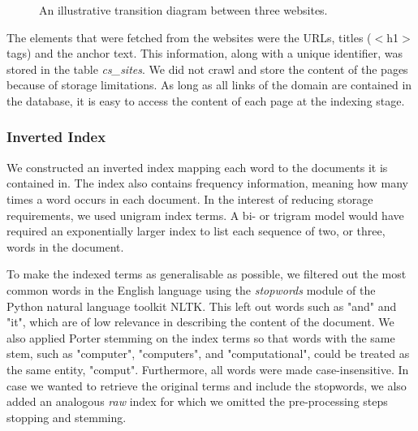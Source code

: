 \begin{figure}[!h]
\centering
\caption{An illustrative transition diagram between three websites.}
\label{fig:graph}
\end{figure}

The elements that were fetched from the websites were the URLs, titles ($<$h1$>$ tags) and the anchor text. This information, along with a unique identifier, was stored in the table \emph{cs\_sites}. We did not crawl and store the content of the pages because of storage limitations. As long as all links of the domain are contained in the database, it is easy to access the content of each page at the indexing stage.


\subsubsection{Inverted Index} %
\label{ssub:inverted_index}

We constructed an inverted index mapping each word to the documents it is contained in. The index also contains frequency information, meaning how many times a word occurs in each document. In the interest of reducing storage requirements, we used unigram index terms. A bi- or trigram model would have required an exponentially larger index to list each sequence of two, or three, words in the document.

To make the indexed terms as generalisable as possible, we filtered out the most common words in the English language using the \emph{stopwords} module of the Python natural language toolkit NLTK. This left out words such as "and" and "it", which are of low relevance in describing the content of the document. We also applied Porter stemming \cite{porter1980algorithm} on the index terms so that words with the same stem, such as "computer", "computers", and "computational", could be treated as the same entity, "comput". Furthermore, all words were made case-insensitive. In case we wanted to retrieve the original terms and include the stopwords, we also added an analogous \emph{raw} index for which we omitted the pre-processing steps stopping and stemming.

